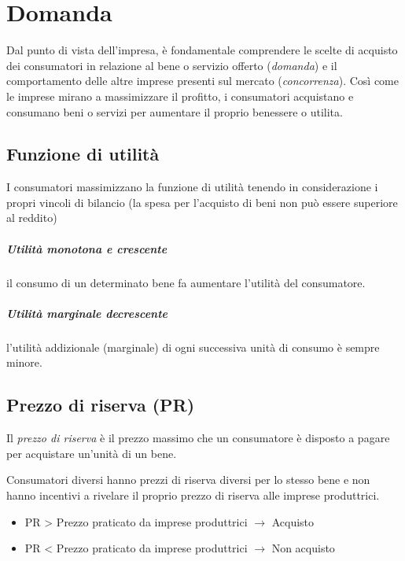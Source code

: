 \chapter{Domanda}
Dal punto di vista dell’impresa, \`e fondamentale comprendere le scelte di acquisto dei
\gls{consumatori} in relazione al bene o servizio offerto (\emph{domanda}) e il comportamento delle altre imprese
presenti sul mercato (\emph{concorrenza}).
Così come le imprese mirano a massimizzare il profitto, i consumatori acquistano e consumano beni o
servizi per aumentare il proprio benessere o \gls{utilita}.

\section{Funzione di utilità}

I consumatori massimizzano la funzione di utilità tenendo in considerazione i propri vincoli di bilancio
(la spesa per l’acquisto di beni non può essere superiore al reddito)

\paragraph{Utilità monotona e crescente}
il consumo di un determinato bene fa aumentare l’utilità del
consumatore.

\paragraph{Utilità marginale decrescente}
l’utilità addizionale (marginale) di ogni successiva unità di consumo è
sempre minore.

\section{Prezzo di riserva (PR)}

Il \emph{prezzo di riserva} è il prezzo massimo che un consumatore è disposto a pagare per acquistare
un’unità di un bene.

Consumatori diversi hanno prezzi di riserva diversi per lo stesso bene e non hanno incentivi a rivelare il proprio prezzo di riserva alle imprese produttrici.

\begin{itemize}
	\item PR > Prezzo praticato da imprese produttrici $\rightarrow$ Acquisto
	\item PR < Prezzo praticato da imprese produttrici $\rightarrow$ Non acquisto
\end{itemize}

